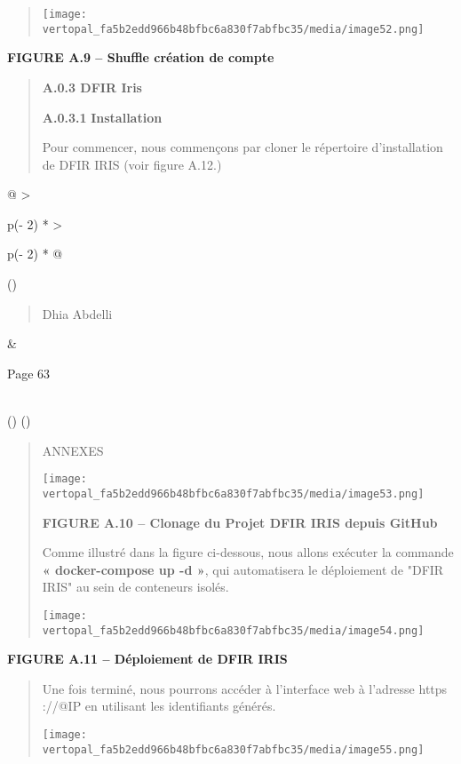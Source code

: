 \documentclass[
]{article}
\begin{document}
\begin{quote}
\texttt{[image: vertopal\_fa5b2edd966b48bfbc6a830f7abfbc35/media/image52.png]}
\end{quote}

\textbf{FIGURE A.9 -- Shuffle création de compte}

\begin{quote}
\textbf{A.0.3 DFIR Iris}

\textbf{A.0.3.1} \textbf{Installation}

Pour commencer, nous commençons par cloner le répertoire d'installation
de DFIR IRIS (voir figure A.12.)
\end{quote}

\begin{longtable}[]{@{}
  >{\raggedright\arraybackslash}p{(\columnwidth - 2\tabcolsep) * }
  >{\raggedright\arraybackslash}p{(\columnwidth - 2\tabcolsep) * }@{}}
\toprule()
\begin{minipage}[b]{\linewidth}\raggedright
\begin{quote}
Dhia Abdelli
\end{quote}
\end{minipage} & \begin{minipage}[b]{\linewidth}\raggedright
Page 63
\end{minipage} \\
\midrule()
\endhead
\bottomrule()
\end{longtable}

\begin{quote}
ANNEXES

\texttt{[image: vertopal\_fa5b2edd966b48bfbc6a830f7abfbc35/media/image53.png]}

\textbf{FIGURE A.10 -- Clonage du Projet DFIR IRIS depuis GitHub}

Comme illustré dans la figure ci-dessous, nous allons exécuter la
commande \textbf{« docker-compose up -d »}, qui automatisera le
déploiement de "DFIR IRIS" au sein de conteneurs isolés.

\texttt{[image: vertopal\_fa5b2edd966b48bfbc6a830f7abfbc35/media/image54.png]}
\end{quote}

\textbf{FIGURE A.11 -- Déploiement de DFIR IRIS}

\begin{quote}
Une fois terminé, nous pourrons accéder à l'interface web à l'adresse
https ://@IP en utilisant les identifiants générés.

\texttt{[image: vertopal\_fa5b2edd966b48bfbc6a830f7abfbc35/media/image55.png]}
\end{quote}
\end{document}
